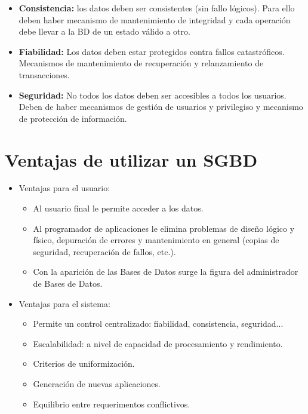 \documentclass[a4paper,11pt]{article}
\begin{document}
\begin{itemize}
\item \textbf{Consistencia:} los datos deben ser consistentes (sin fallo lógicos). Para ello deben haber mecanismo de mantenimiento de integridad y cada operación debe llevar a la BD de un estado válido a otro.

\item \textbf{Fiabilidad:} Los datos deben estar protegidos contra fallos catastróficos. Mecanismos de mantenimiento de recuperación y relanzamiento de transacciones.

\item \textbf{Seguridad:} No todos los datos deben ser accesibles a todos los usuarios. Deben de haber mecanismos de gestión de usuarios y privilegiso y mecanismo de protección de información.
\end{itemize}

\section{Ventajas de utilizar un SGBD}
\begin{itemize}
\item Ventajas para el usuario:

	\begin{itemize}
		\item Al usuario final le permite acceder a los datos.
		\item Al programador de aplicaciones le elimina problemas de diseño lógico y físico, depuración de errores y mantenimiento en general (copias de seguridad, recuperación de fallos, etc.).
		\item Con la aparición de las Bases de Datos surge la figura del administrador de Bases de Datos.
	\end{itemize}
	
\item Ventajas para el sistema:
	
	\begin{itemize}
		\item Permite un control centralizado: fiabilidad, consistencia, seguridad...
		\item Escalabilidad: a nivel de capacidad de procesamiento y rendimiento.
		\item Criterios de uniformización.
		\item Generación de nuevas aplicaciones.
		\item Equilibrio entre requerimentos conflictivos.
	\end{itemize}
\end{itemize}
\end{document}

